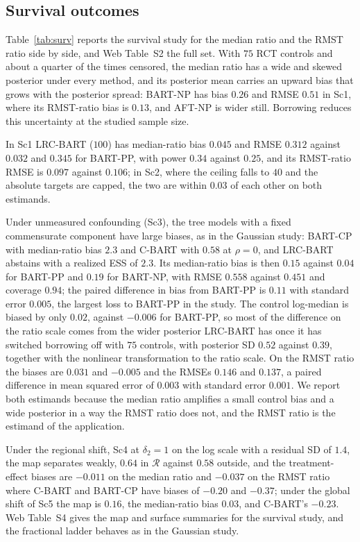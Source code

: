 


\subsection{Survival outcomes}
\label{sec:sim_surv}

Table~\ref{tab:surv} reports the survival study for the median ratio and the RMST ratio side by side, and Web Table~S2 the full set. With $75$ RCT controls and about a quarter of the times censored, the median ratio has a wide and skewed posterior under every method, and its posterior mean carries an upward bias that grows with the posterior spread: BART-NP has bias $0.26$ and RMSE $0.51$ in Sc1, where its RMST-ratio bias is $0.13$, and AFT-NP is wider still. Borrowing reduces this uncertainty at the studied sample size.

In Sc1 LRC-BART ($100$) has median-ratio bias $0.045$ and RMSE $0.312$ against $0.032$ and $0.345$ for BART-PP, with power $0.34$ against $0.25$, and its RMST-ratio RMSE is $0.097$ against $0.106$; in Sc2, where the ceiling falls to $40$ and the absolute targets are capped, the two are within $0.03$ of each other on both estimands.

Under unmeasured confounding (Sc3), the tree models with a fixed commensurate component have large biases, as in the Gaussian study: BART-CP with median-ratio bias $2.3$ and C-BART with $0.58$ at $\rho=0$, and LRC-BART abstains with a realized ESS of $2.3$. Its median-ratio bias is then $0.15$ against $0.04$ for BART-PP and $0.19$ for BART-NP, with RMSE $0.558$ against $0.451$ and coverage $0.94$; the paired difference in bias from BART-PP is $0.11$ with standard error $0.005$, the largest loss to BART-PP in the study. The control log-median is biased by only $0.02$, against $-0.006$ for BART-PP, so most of the difference on the ratio scale comes from the wider posterior LRC-BART has once it has switched borrowing off with $75$ controls, with posterior SD $0.52$ against $0.39$, together with the nonlinear transformation to the ratio scale. On the RMST ratio the biases are $0.031$ and $-0.005$ and the RMSEs $0.146$ and $0.137$, a paired difference in mean squared error of $0.003$ with standard error $0.001$. We report both estimands because the median ratio amplifies a small control bias and a wide posterior in a way the RMST ratio does not, and the RMST ratio is the estimand of the application.

Under the regional shift, Sc4 at $\delta_2=1$ on the log scale with a residual SD of $1.4$, the map separates weakly, $0.64$ in $\mathcal R$ against $0.58$ outside, and the treatment-effect biases are $-0.011$ on the median ratio and $-0.037$ on the RMST ratio where C-BART and BART-CP have biases of $-0.20$ and $-0.37$; under the global shift of Sc5 the map is $0.16$, the median-ratio bias $0.03$, and C-BART's $-0.23$. Web Table~S4 gives the map and surface summaries for the survival study, and the fractional ladder behaves as in the Gaussian study.

